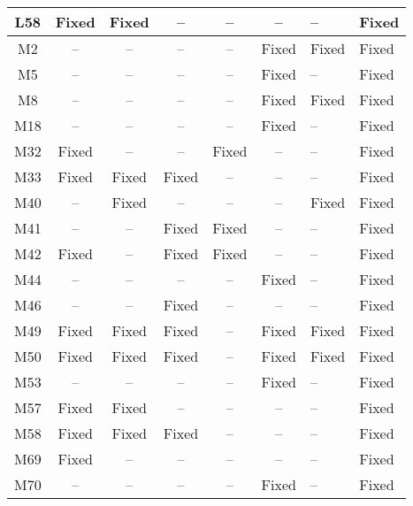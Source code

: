\begin{table}[!t]
{\begin{tabular}{|c|c|c|c|c|c|}
L58               & Fixed     & Fixed     & --        & --        & --        & --        &Fixed   \\
\hline
M2                & --        & --        & --        & --        & Fixed     & Fixed     &Fixed   \\
M5                & --        & --        & --        & --        & Fixed     & --        &Fixed   \\
M8                & --        & --        & --        & --        & Fixed     & Fixed     &Fixed   \\
M18               & --        & --        & --        & --        & Fixed     & --        &Fixed   \\
M32               & Fixed     & --        & --        & Fixed     & --        & --        &Fixed   \\
M33               & Fixed     & Fixed     & Fixed     & --        & --        & --        &Fixed   \\
M40               & --        & Fixed     & --        & --        & --        & Fixed     &Fixed   \\
M41               & --        & --        & Fixed     & Fixed     & --        & --        &Fixed   \\
M42               & Fixed     & --        & Fixed     & Fixed     & --        & --        &Fixed   \\
M44               & --        & --        & --        & --        & Fixed     & --        &Fixed   \\
M46               & --        & --        & Fixed     & --        & --        & --        &Fixed   \\
M49               & Fixed     & Fixed     & Fixed     & --        & Fixed     & Fixed     &Fixed   \\
M50               & Fixed     & Fixed     & Fixed     & --        & Fixed     & Fixed     &Fixed   \\
M53               & --        & --        & --        & --        & Fixed     & --        &Fixed   \\
M57               & Fixed     & Fixed     & --        & --        & --        & --        &Fixed   \\
M58               & Fixed     & Fixed     & Fixed     & --        & --        & --        &Fixed   \\
M69               & Fixed     & --        & --        & --        & --        & --        &Fixed   \\
M70               & --        & --        & --        & --        & Fixed     & --        &Fixed   \\

\end{tabular}}
\end{table}
